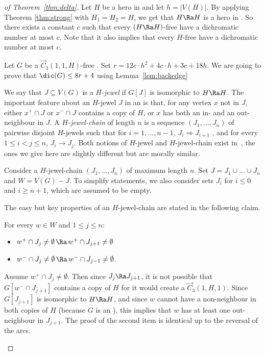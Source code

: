 \begin{proof}[of Theorem~\ref{thm:delta}]
Let $H$ be a hero in \omgs and let $h = |V(H)|$. By applying Theorem \ref{thm:strong} with $H_1 = H_2 = H$, we get that $H \Ra H$ is a hero in \omgs. 
So there exists a constant $c$ such that every $(H \Ra H)$-free \omgs have a dichromatic number at most $c$. Note that it also implies that every $H$-free  \omgs have a dichromatic number at most $c$. 

Let $G$ be a $\vec C_{3}(1, 1, H)$-free \omg. 
Set $r = 12c \cdot h^2 + 4c \cdot h + 3c + 18h$. 
We are going to prove that $\dic(G) \leq 8r + 4$ using Lemma~\ref{lem:backedge}


We say that $J\subseteq V(G)$ is a \emph{$H$-jewel} if $G[J]$ is isomorphic to $H\Ra H$. 
The important feature about an $H$-jewel $J$ in an \omg is that, for any vertex $x$ not in $J$, either $x^+ \cap J$ or $x^- \cap J$ contains a copy of $H$, or $x$ has both an in- and an out-neighbour in $J$. 
A \emph{$H$-jewel-chain} of length $n$ is a sequence $(J_1, \dots, J_n)$ of pairwise disjoint $H$-jewels such that for  $i=1, \dots, n-1$, $J_i \Rightarrow J_{i+1}$ , and for  every $1 \leq i < j \leq n$, $J_i \rightarrow J_j$. 
Both notions of $H$-jewel and $H$-jewel-chain exist in~\cite{hero}, the ones we give here are slightly different but are morally similar.  


Consider a $H$-jewel-chain $(J_1, \dots, J_n)$ of maximum length $n$. 
Set $J = J_1 \cup \dots \cup J_n$ and $W=V(G) - J$. To simplify statements, we also consider sets $J_i$ for $i\leq 0$ and $i \geq n+1$, which are assumed to be empty. 

The easy but key properties of an $H$-jewel-chain are stated in the following claim.

\begin{claim}\label{claim:jewel-chain}
For every $w\in W$ and $1\leq j \leq n$:
\begin{itemize}
\item $w^+\cap J_j \neq\emptyset \, \Ra \,  w^+\cap J_{j+1} \neq\emptyset$ 
\item $w^-\cap J_j \neq\emptyset\, \Ra \, w^-\cap J_{j-1} \neq\emptyset$. 
\end{itemize}

\end{claim}
\begin{subproof}
Assume $w^+\cap J_j \neq\emptyset$. Then since $J_j\Ra J_{j+1}$, it is not possible that $G[w^-\cap J_{j+1}]$ contains a copy of $H$ for it would create a $\vec C_{3}(1, H, 1)$. Since $G[J_{j+1}]$ is isomorphic to $H\Ra H$, and since $w$ cannot have a non-neighbour in both copies of $H$ (because $G$ is an \omg), this implies that $w$ has at least one out-neighbour in $J_{j+1}$. The proof of the second item is identical up to the reversal of the arcs.
\end{subproof}


\end{proof}
